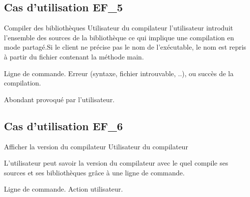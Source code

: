 \subsection{Cas d'utilisation EF\_5}
\fiche
{Compiler des bibliothèques}                      %
{Utilisateur du compilateur}                               %
{                                                %
   l'utilisateur introduit l'ensemble des sources de la  bibliothèque ce qui implique une  compilation 
   en mode partagé.Si le client ne précise pas le nom de l’exécutable, le nom est repris à partir du fichier contenant la méthode main.    
}
{
  
}                                                %
{Ligne de commande.}                             %
{Erreur (syntaxe, fichier introuvable, ..), ou 
 succès de la compilation.}                       %
{                                                %
 
}{} %
{Abondant provoqué par l'utilisateur.} %
\subsection{Cas d'utilisation EF\_6}
\fiche
{Afficher la version du compilateur}                      %
{Utilisateur du compilateur}                               %
{                                                %
   
L'utilisateur peut savoir la version du compilateur avec le quel compile ses sources et ses bibliothèques grâce à une ligne de commande.   
}
{
  
}                                                %
{Ligne de commande.}                             %
{Action utilisateur.}                       %
{                                                %
 
}{} %
{} %
